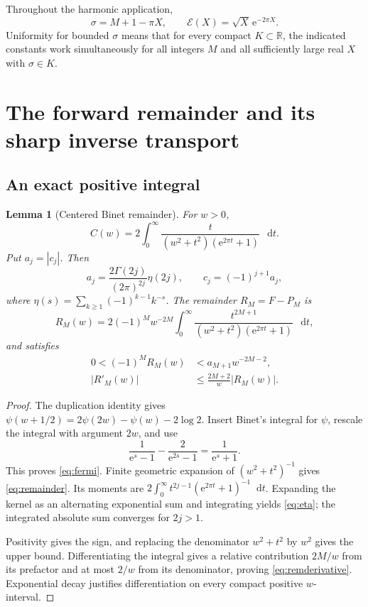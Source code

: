 \documentclass[11pt,a4paper]{article}
\newtheorem{lemma}[theorem]{Lemma}
\theoremstyle{definition}
\numberwithin{equation}{section}
\newcommand{\R}{\mathbb R}
\newcommand{\dd}{\mathop{}\!\mathrm d}
\newcommand{\e}{\mathrm e}
\newcommand{\scal}{\mathcal E}
\begin{document}
Throughout the harmonic application,
\begin{equation}
 \sigma=M+1-\pi X,\qquad
 \scal(X)=\sqrt X\,\e^{-2\pi X}.
 \label{eq:scale}
\end{equation}
Uniformity for bounded $\sigma$ means that for every compact $K\subset\R$, the indicated constants work simultaneously for all integers $M$ and all sufficiently large real $X$ with $\sigma\in K$.

\section{The forward remainder and its sharp inverse transport}
\label{sec:forward}

\subsection{An exact positive integral}
\begin{lemma}[Centered Binet remainder]
\label{lem:fermi}
For $w>0$,
\begin{equation}
 C(w)=2\int_0^\infty
   \frac{t}{(w^2+t^2)(\e^{2\pi t}+1)}\,\dd t.
 \label{eq:fermi}
\end{equation}
Put $a_j=|c_j|$. Then
\begin{equation}
 a_j=\frac{2\Gamma(2j)}{(2\pi)^{2j}}\eta(2j),
 \qquad c_j=(-1)^{j+1}a_j,
 \label{eq:eta}
\end{equation}
where $\eta(s)=\sum_{k\ge1}(-1)^{k-1}k^{-s}$. The remainder $R_M=F-P_M$ is
\begin{equation}
 R_M(w)=2(-1)^Mw^{-2M}
 \int_0^\infty\frac{t^{2M+1}}{(w^2+t^2)(\e^{2\pi t}+1)}\,\dd t,
 \label{eq:remainder}
\end{equation}
and satisfies
\begin{align}
 0<(-1)^MR_M(w)&<a_{M+1}w^{-2M-2},\label{eq:rembound}\\
 |R'_M(w)|&\le\frac{2M+2}{w}|R_M(w)|.
 \label{eq:remderivative}
\end{align}
\end{lemma}
\begin{proof}
The duplication identity gives
$\psi(w+1/2)=2\psi(2w)-\psi(w)-2\log2$. Insert Binet's integral for $\psi$, rescale the integral with argument $2w$, and use
\[
 \frac1{\e^s-1}-\frac2{\e^{2s}-1}=\frac1{\e^s+1}.
\]
This proves \eqref{eq:fermi}. Finite geometric expansion of $(w^2+t^2)^{-1}$ gives \eqref{eq:remainder}. Its moments are
$2\int_0^\infty t^{2j-1}(\e^{2\pi t}+1)^{-1}\dd t$.
Expanding the kernel as an alternating exponential sum and integrating yields \eqref{eq:eta}; the integrated absolute sum converges for $2j>1$.

Positivity gives the sign, and replacing the denominator $w^2+t^2$ by $w^2$ gives the upper bound. Differentiating the integral gives a relative contribution $2M/w$ from its prefactor and at most $2/w$ from its denominator, proving \eqref{eq:remderivative}. Exponential decay justifies differentiation on every compact positive $w$-interval.
\end{proof}
\end{document}
